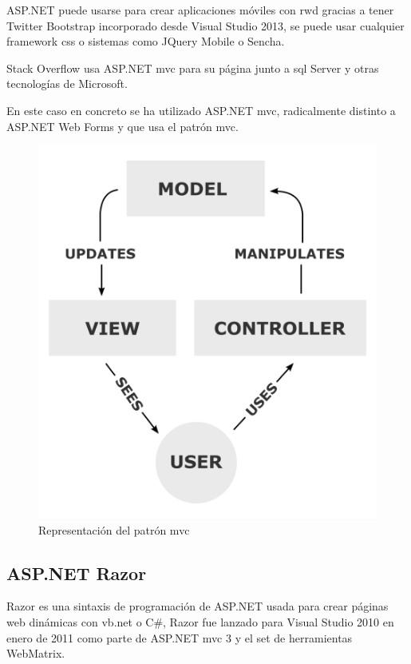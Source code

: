 ASP.NET puede usarse para crear aplicaciones móviles con \acrshort{rwd} gracias a tener Twitter Bootstrap incorporado desde Visual Studio 2013, se puede usar cualquier framework \acrshort{css} o sistemas como JQuery Mobile o Sencha.

Stack Overflow\cite{StackOverflow} usa ASP.NET \acrshort{mvc} para su página junto a \acrshort{sql} Server y otras tecnologías de Microsoft.

En este caso en concreto se ha utilizado ASP.NET \acrshort{mvc}, radicalmente distinto a ASP.NET Web Forms y que usa el patrón \acrfull{mvc}.

\begin{figure}[!htbp]
	\centering
	\includegraphics[scale=0.50]{fig/mvc_pattern}
	\caption{Representación del patrón \acrshort{mvc}}
\end{figure}

\FloatBarrier

\subsection{ASP.NET Razor}

Razor es una sintaxis de programación de ASP.NET usada para crear páginas web dinámicas con \acrshort{vb.net} o C\#, Razor fue lanzado para Visual Studio 2010 en enero de 2011 como parte de ASP.NET \acrshort{mvc} 3 y el set de herramientas WebMatrix.

